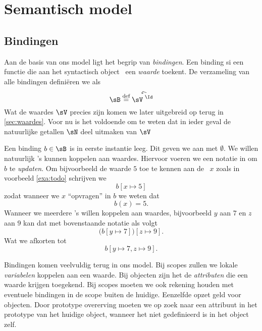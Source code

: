 \chapter{Semantisch model}

\section{Bindingen}\label{sec:bindinge}

Aan de basis van ons model ligt het begrip van \emph{bindingen}. Een binding si een functie die aan het syntactisch object \Id\ een \emph{waarde} toekent. De verzameling van alle bindingen definiëren we als 
  \begin{equation*}
  \sB \DEF \FiniteFunctions{\sV}{\Id}
  \end{equation*}
Wat de waardes $\sV$ precies zijn komen we later uitgebreid op terug in \ref{sec:waardes}. Voor nu is het voldoende om te weten dat in ieder geval de natuurlijke getallen $\sN$ deel uitmaken van $\sV$

Een binding $b\in\sB$ is in eerste instantie leeg. Dit geven we aan met $\emptyset$. We willen natuurlijk \Id's kunnen koppelen aan waardes. Hiervoor voeren we een notatie in om $b$ te \emph{updaten}. Om bijvoorbeeld de waarde $5$ toe te kennen aan de \Id\ $x$ zoals in voorbeeld \ref{exa:todo} schrijven we
\begin{equation*}
  b[x \mapsto 5]
\end{equation*}
zodat wanneer we $x$ \enquote{opvragen} in $b$ we weten dat
\begin{equation*}
  b(x) = 5.
\end{equation*}
Wanneer we meerdere \Id's willen koppelen aan waardes, bijvoorbeeld $y$ aan $7$ en $z$ aan $9$ kan dat met bovenstaande notatie als volgt
\begin{equation*}
  \big(b[y \mapsto 7]\big)[z \mapsto 9].
\end{equation*}
Wat we afkorten tot
\begin{equation*}
  b[y \mapsto 7, z \mapsto 9].
\end{equation*}

Bindingen komen veelvuldig terug in ons model. Bij scopes zullen we lokale \emph{variabelen} koppelen aan een waarde. Bij objecten zijn het de \emph{attributen} die een waarde krijgen toegekend. Bij scopes moeten we ook rekening houden met eventuele bindingen in de scope buiten de huidige. Eenzelfde opzet geld voor objecten. Door prototype overerving moeten we op zoek naar een attribuut in het prototype van het huidige object, wanneer het niet gedefinieerd is in het object zelf.

